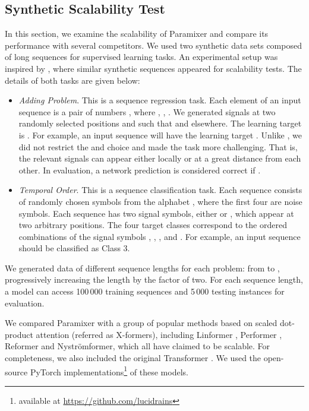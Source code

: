 \documentclass{article}
\begin{document}
\subsection{Synthetic Scalability Test}
In this section, we examine the scalability of Paramixer and compare its performance with several competitors. We used two synthetic data sets composed of long sequences for supervised learning tasks. An experimental setup was inspired by  \cite{hochreiter1997long}, where similar synthetic sequences appeared for scalability tests. The details of both tasks are given below:
\begin{itemize}
    \item \textit{Adding Problem}. This is a sequence regression task. Each element of an input sequence is a pair of numbers , where , , . We generated signals at two randomly selected positions  and  such that  and  elsewhere. The learning target is . For example, an input sequence  will have the learning target . Unlike \cite{hochreiter1997long}, we did not restrict the  and  choice and made the task more challenging. That is, the relevant signals can appear either locally or at a great distance from each other. In evaluation, a network prediction  is considered correct if .
    \item \textit{Temporal Order}. This is a sequence classification task. Each sequence consists of randomly chosen symbols from the alphabet , where the first four are noise symbols. Each sequence has two signal symbols, either  or , which appear at two arbitrary positions. The four target classes correspond to the ordered combinations of the signal symbols , , , and . For example, an input sequence  should be classified as Class 3.
\end{itemize}
We generated data of different sequence lengths for each problem: from  to , progressively increasing the length by the factor of two. For each sequence length, a model can access 100\,000 training sequences and 5\,000 testing instances for evaluation. 

We compared Paramixer with a group of popular methods based on scaled dot-product attention (referred as X-formers), including Linformer \cite{linformer}, Performer \cite{performer}, Reformer \cite{kitaev2020reformer} and Nystr\"omformer, which all \cite{nystromformer} have claimed to be scalable. For completeness, we also included the original Transformer \cite{vaswani2017attention}. We used the open-source PyTorch implementations\footnote{available at \url{https://github.com/lucidrains}} of these models.
\end{document}
